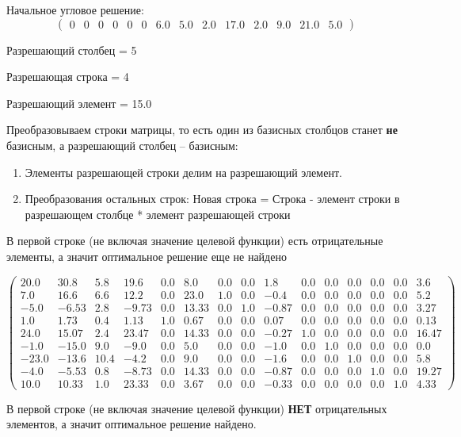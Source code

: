 \documentclass[a4paper, 14pt]{extarticle}
\newenvironment{widerequation}{%
	\begin{adjustwidth}{-2cm}{-2cm}\[}
		{\]\end{adjustwidth}}
\begin{document}
		Начальное угловое решение:
		\[ \begin{pmatrix}
			0 & 0 & 0 & 0 & 0 & 0 & 6.0 & 5.0 & 2.0 & 17.0 & 2.0 & 9.0 & 21.0 & 5.0
		\end{pmatrix} \]
	
		Разрешающий столбец = 5
		
		Разрешающая строка = 4
		
		Разрешающий элемент = 15.0
		
       	Преобразовываем строки матрицы, то есть один из базисных столбцов станет \textbf{не} базисным, а разрешающий столбец – базисным:
       	\begin{enumerate}
       		\item Элементы разрешающей строки делим на разрешающий элемент.
       		\item Преобразования остальных строк: Новая строка = Строка -
       		элемент строки в разрешающем столбце * элемент разрешающей строки
       	\end{enumerate}
       
       В первой строке (не включая значение целевой функции) есть отрицательные элементы, а значит оптимальное решение еще не найдено
       	
       	\begin{widerequation}\begin{pmatrix}
       		20.0&30.8&5.8&19.6&0.0&8.0&0.0&0.0&1.8&0.0&0.0&0.0&0.0&0.0&3.6\\
       		7.0&16.6&6.6&12.2&0.0&23.0&1.0&0.0&-0.4&0.0&0.0&0.0&0.0&0.0&5.2\\
       		-5.0&-6.53&2.8&-9.73&0.0&13.33&0.0&1.0&-0.87&0.0&0.0&0.0&0.0&0.0&3.27\\
       		1.0&1.73&0.4&1.13&1.0&0.67&0.0&0.0&0.07&0.0&0.0&0.0&0.0&0.0&0.13\\
       		24.0&15.07&2.4&23.47&0.0&14.33&0.0&0.0&-0.27&1.0&0.0&0.0&0.0&0.0&16.47\\
       		-1.0&-15.0&9.0&-9.0&0.0&5.0&0.0&0.0&-1.0&0.0&1.0&0.0&0.0&0.0&0.0\\
       		-23.0&-13.6&10.4&-4.2&0.0&9.0&0.0&0.0&-1.6&0.0&0.0&1.0&0.0&0.0&5.8\\
       		-4.0&-5.53&0.8&-8.73&0.0&14.33&0.0&0.0&-0.87&0.0&0.0&0.0&1.0&0.0&19.27\\
       		10.0&10.33&1.0&23.33&0.0&3.67&0.0&0.0&-0.33&0.0&0.0&0.0&0.0&1.0&4.33
       	\end{pmatrix}\end{widerequation}
		             
  		В первой строке (не включая значение целевой функции) \textbf{НЕТ}
  		отрицательных элементов, а значит оптимальное решение найдено.
  		
\end{document}
